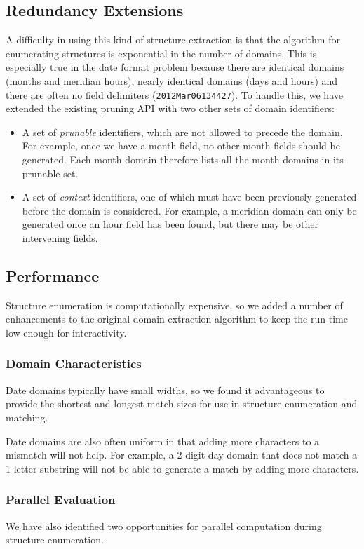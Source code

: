 \subsection{Redundancy Extensions}
A difficulty in using this kind of structure extraction is that the algorithm for enumerating structures is exponential in the number of domains. This is especially true in the date format problem because there are identical domains (\eg months and meridian hours), nearly identical domains (\eg days and hours) and there are often no field delimiters (\eg \texttt{2012Mar06134427}). To handle this, we have extended the existing pruning API with two other sets of domain identifiers:
\begin{itemize}
\item A set of \textit{prunable} identifiers, which are not allowed to precede the domain. For example, once we have a month field, no other month fields should be generated. Each month domain therefore lists all the month domains in its prunable set.
\item A set of \textit{context} identifiers, one of which must have been previously generated before the domain is considered. For example, a meridian domain can only be generated once an hour field has been found, but there may be other intervening fields.
\end{itemize}

\subsection{Performance}
Structure enumeration is computationally expensive, so we added a number of enhancements to the original domain extraction algorithm to keep the run time low enough for interactivity.

\subsubsection{Domain Characteristics}
Date domains typically have small widths, so we found it advantageous to provide the shortest and longest match sizes for use in structure enumeration and matching.

Date domains are also often uniform in that adding more characters to a mismatch will not help. For example, a 2-digit day domain that does not match a 1-letter substring will not be able to generate a match by adding more characters.

\subsubsection{Parallel Evaluation}
We have also identified two opportunities for parallel computation during structure enumeration.

